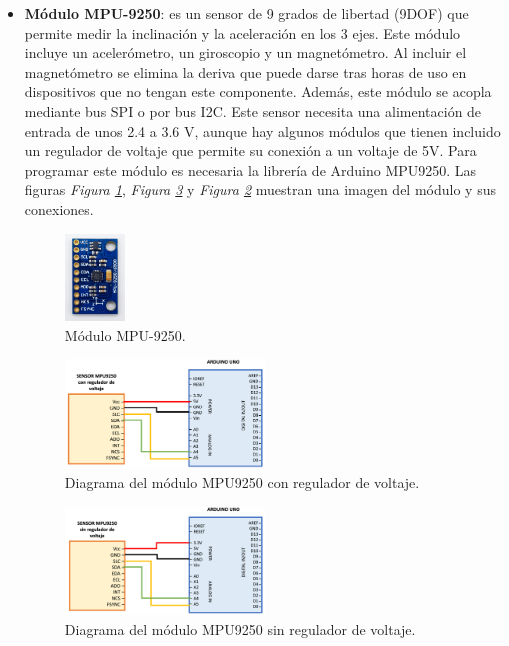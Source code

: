 \begin{itemize}
    \item \textbf{Módulo MPU-9250}\cite{MPU9250_1,MPU9250_2}: es un sensor de 9 grados de libertad (9DOF) que permite medir la inclinación y la aceleración en los 3 ejes. Este módulo incluye un acelerómetro, un giroscopio y un magnetómetro. Al incluir el magnetómetro se elimina la deriva que puede darse tras horas de uso en dispositivos que no tengan este componente. Además, este módulo se acopla mediante bus SPI o por bus I2C. Este sensor necesita una alimentación de entrada de unos 2.4 a 3.6 V, aunque hay algunos módulos que tienen incluido un regulador de voltaje que permite su conexión a un voltaje de 5V. Para programar este módulo es necesaria la librería de Arduino MPU9250\cite{libMPU9250}. Las figuras \textit{Figura \ref{fig:imgMPU9250}}, \textit{Figura \ref{fig:MPU9250}} y \textit{Figura \ref{fig:MPU9250R}} muestran una imagen del módulo y sus conexiones.
\begin{figure}[h!]
    \centering
    \includegraphics[width=0.15\textwidth]{img/imgMPU9250.jpg}
    \caption{Módulo MPU-9250\cite{imgMPU9250}.}
    \label{fig:imgMPU9250} 
\end{figure}

\begin{figure}[h!]
    \centering
    \includegraphics[width=0.5\textwidth]{img/MPU9250Regulador.png}
    \caption{Diagrama del módulo MPU9250 con regulador de voltaje.}
    \label{fig:MPU9250R} 
\end{figure}
\begin{figure}[h!]
    \centering
    \includegraphics[width=0.5\textwidth]{img/MPU9250SinRegulador.png}
    \caption{Diagrama del módulo MPU9250 sin regulador de voltaje.}
    \label{fig:MPU9250} 
\end{figure}

\end{itemize}

